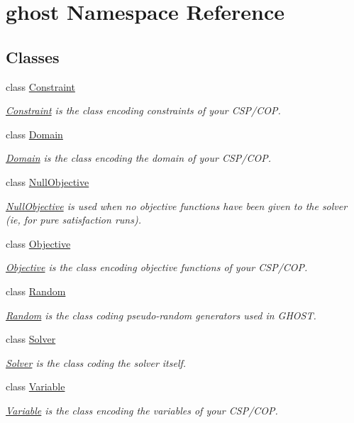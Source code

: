 \hypertarget{namespaceghost}{}\section{ghost Namespace Reference}
\label{namespaceghost}
\subsection*{Classes}
\begin{DoxyCompactItemize}
\item 
class \hyperlink{classghost_1_1Constraint}{Constraint}
\begin{DoxyCompactList}\small\item\em \hyperlink{classghost_1_1Constraint}{Constraint} is the class encoding constraints of your C\+S\+P/\+C\+OP. \end{DoxyCompactList}\item 
class \hyperlink{classghost_1_1Domain}{Domain}
\begin{DoxyCompactList}\small\item\em \hyperlink{classghost_1_1Domain}{Domain} is the class encoding the domain of your C\+S\+P/\+C\+OP. \end{DoxyCompactList}\item 
class \hyperlink{classghost_1_1NullObjective}{Null\+Objective}
\begin{DoxyCompactList}\small\item\em \hyperlink{classghost_1_1NullObjective}{Null\+Objective} is used when no objective functions have been given to the solver (ie, for pure satisfaction runs). \end{DoxyCompactList}\item 
class \hyperlink{classghost_1_1Objective}{Objective}
\begin{DoxyCompactList}\small\item\em \hyperlink{classghost_1_1Objective}{Objective} is the class encoding objective functions of your C\+S\+P/\+C\+OP. \end{DoxyCompactList}\item 
class \hyperlink{classghost_1_1Random}{Random}
\begin{DoxyCompactList}\small\item\em \hyperlink{classghost_1_1Random}{Random} is the class coding pseudo-\/random generators used in G\+H\+O\+ST. \end{DoxyCompactList}\item 
class \hyperlink{classghost_1_1Solver}{Solver}
\begin{DoxyCompactList}\small\item\em \hyperlink{classghost_1_1Solver}{Solver} is the class coding the solver itself. \end{DoxyCompactList}\item 
class \hyperlink{classghost_1_1Variable}{Variable}
\begin{DoxyCompactList}\small\item\em \hyperlink{classghost_1_1Variable}{Variable} is the class encoding the variables of your C\+S\+P/\+C\+OP. \end{DoxyCompactList}\end{DoxyCompactItemize}

